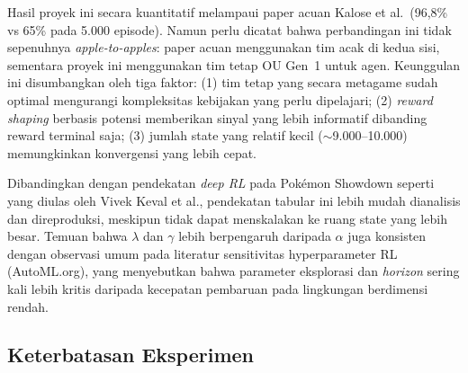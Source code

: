 \documentclass[11pt,a4paper,oneside]{report}
\begin{document}
Hasil proyek ini secara kuantitatif melampaui paper acuan Kalose et al.\ (96,8\% vs 65\% pada 5.000 episode). Namun perlu dicatat bahwa perbandingan ini tidak sepenuhnya \textit{apple-to-apples}: paper acuan menggunakan tim acak di kedua sisi, sementara proyek ini menggunakan tim tetap OU Gen~1 untuk agen. Keunggulan ini disumbangkan oleh tiga faktor: (1) tim tetap yang secara metagame sudah optimal mengurangi kompleksitas kebijakan yang perlu dipelajari; (2) \textit{reward shaping} berbasis potensi memberikan sinyal yang lebih informatif dibanding reward terminal saja; (3) jumlah state yang relatif kecil ($\sim$9.000--10.000) memungkinkan konvergensi yang lebih cepat.

Dibandingkan dengan pendekatan \textit{deep RL} pada Pokémon Showdown seperti yang diulas oleh Vivek Keval et al., pendekatan tabular ini lebih mudah dianalisis dan direproduksi, meskipun tidak dapat menskalakan ke ruang state yang lebih besar. Temuan bahwa $\lambda$ dan $\gamma$ lebih berpengaruh daripada $\alpha$ juga konsisten dengan observasi umum pada literatur sensitivitas hyperparameter RL (AutoML.org), yang menyebutkan bahwa parameter eksplorasi dan \textit{horizon} sering kali lebih kritis daripada kecepatan pembaruan pada lingkungan berdimensi rendah.

\subsection*{Keterbatasan Eksperimen}
\end{document}

